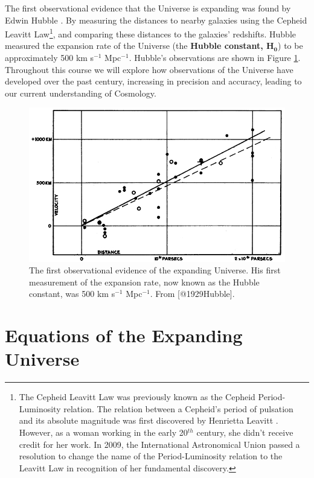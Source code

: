 \documentclass[11pt,a4paper,notoc]{tufte-handout}
\let\rmarkdownfootnote\footnote%
\def\footnote{\protect\rmarkdownfootnote}
\begin{document}
The first observational evidence that the Universe is expanding was
found by Edwin Hubble \citep{1929Hubble}. By measuring the distances
to nearby galaxies using the Cepheid Leavitt Law\footnote{The Cepheid Leavitt Law was previously known as the Cepheid
  Period-Luminosity relation. The relation between a Cepheid's period
  of pulsation and its absolute magnitude was first discovered by
  Henrietta Leavitt \citep{1912Leavitt}. However, as a woman
  working in the early 20\(^{th}\) century, she didn't receive credit
  for her work. In 2009, the International Astronomical Union passed a
  resolution to change the name of the Period-Luminosity relation to
  the Leavitt Law in recognition of her fundamental discovery.}, and comparing
these distances to the galaxies' redshifts. Hubble measured the
expansion rate of the Universe (the \textbf{Hubble constant, \(\mathbf{H_0}\)})
to be approximately 500 km s\(^{-1}\) Mpc\(^{-1}\). Hubble's observations
are shown in
Figure \ref{fig:hubble-h0-diagram}. Throughout this course we will
explore how observations of the Universe have developed over the past
century, increasing in precision and accuracy, leading to our current
understanding of Cosmology.

\begin{figure}
\includegraphics[width=1\linewidth]{Images/hubble-diagram} \caption{The first observational evidence of the expanding Universe. His first measurement of the expansion rate, now known as the Hubble constant, was 500 km s$^{-1}$ Mpc$^{-1}$. From [@1929Hubble].}\label{fig:hubble-h0-diagram}
\end{figure}

\hypertarget{ch:eqs_of_expanding}{%
\section{Equations of the Expanding Universe}\label{ch:eqs_of_expanding}}
\end{document}
